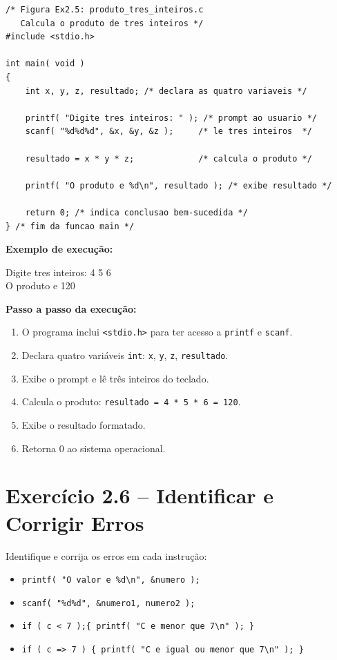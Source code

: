 \documentclass[12pt,a4paper]{article}
\begin{document}
\begin{respostabox}
\begin{lstlisting}
/* Figura Ex2.5: produto_tres_inteiros.c
   Calcula o produto de tres inteiros */
#include <stdio.h>

int main( void )
{
    int x, y, z, resultado; /* declara as quatro variaveis */

    printf( "Digite tres inteiros: " ); /* prompt ao usuario */
    scanf( "%d%d%d", &x, &y, &z );     /* le tres inteiros  */

    resultado = x * y * z;             /* calcula o produto */

    printf( "O produto e %d\n", resultado ); /* exibe resultado */

    return 0; /* indica conclusao bem-sucedida */
} /* fim da funcao main */
\end{lstlisting}

\textbf{Exemplo de execução:}
\begin{saida}
Digite tres inteiros: 4 5 6\\
O produto e 120
\end{saida}

\textbf{Passo a passo da execução:}
\begin{enumerate}
  \item O programa inclui \texttt{<stdio.h>} para ter acesso a \texttt{printf} e \texttt{scanf}.
  \item Declara quatro variáveis \texttt{int}: \texttt{x}, \texttt{y}, \texttt{z}, \texttt{resultado}.
  \item Exibe o prompt e lê três inteiros do teclado.
  \item Calcula o produto: \texttt{resultado = 4 * 5 * 6 = 120}.
  \item Exibe o resultado formatado.
  \item Retorna 0 ao sistema operacional.
\end{enumerate}
\end{respostabox}

\section{Exercício 2.6 -- Identificar e Corrigir Erros}

\begin{enunciadoBox}[Enunciado 2.6]
Identifique e corrija os erros em cada instrução:
\begin{itemize}
  \item[a)] \texttt{printf( "O valor e \%d\textbackslash n", \&numero );}
  \item[b)] \texttt{scanf( "\%d\%d", \&numero1, numero2 );}
  \item[c)] \texttt{if ( c < 7 );\{ printf( "C e menor que 7\textbackslash n" ); \}}
  \item[d)] \texttt{if ( c => 7 ) \{ printf( "C e igual ou menor que 7\textbackslash n" ); \}}
\end{itemize}
\end{enunciadoBox}
\end{document}
